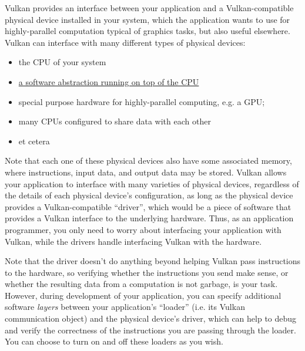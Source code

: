 \documentclass[12pt,letterpaper]{article}
\newcommand{\inquotes}[1]{``#1''}	%
\begin{document}
Vulkan provides an interface between your application and a Vulkan-compatible physical device installed in your system, which the application wants to use for highly-parallel computation typical of graphics tasks, but also useful elsewhere. Vulkan can interface with many different types of physical devices:
	\begin{itemize}
		\item the CPU of your system
		\item \href{https://www.reddit.com/r/vulkan/comments/5f7jhn/is_it_possible_to_run_vulkan_on_cpu/}{a software abstraction running on top of the CPU}
		\item special purpose hardware for highly-parallel computing, e.g. a GPU;
		\item many CPUs configured to share data with each other
		\item et cetera
	\end{itemize}
Note that each one of these physical devices also have some associated memory, where instructions, input data, and output data may be stored. Vulkan allows your application to interface with many varieties of physical devices, regardless of the details of each physical device's configuration, as long as the physical device provides a Vulkan-compatible \inquotes{driver}, which would be a piece of software that provides a Vulkan interface to the underlying hardware. Thus, as an application programmer, you only need to worry about interfacing your application with Vulkan, while the drivers handle interfacing Vulkan with the hardware. 

Note that the driver doesn't do anything beyond helping Vulkan pass instructions to the hardware, so verifying whether the instructions you send make sense, or whether the resulting data from a computation is not garbage, is your task. However, during development of your application, you can specify additional software \emph{layers} between your application's \inquotes{loader} (i.e. its Vulkan communication object) and the physical device's driver, which can help to debug and verify the correctness of the instructions you are passing through the loader. You can choose to turn on and off these loaders as you wish.
\end{document}
